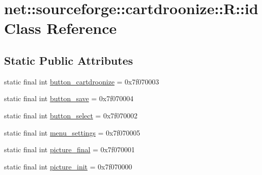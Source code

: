 \hypertarget{classnet_1_1sourceforge_1_1cartdroonize_1_1R_1_1id}{
\section{net::sourceforge::cartdroonize::R::id Class Reference}
\label{classnet_1_1sourceforge_1_1cartdroonize_1_1R_1_1id}
}
\subsection*{Static Public Attributes}
\begin{DoxyCompactItemize}
\item 
static final int \hyperlink{classnet_1_1sourceforge_1_1cartdroonize_1_1R_1_1id_a0edbb295d395022de863e4022c31b11d}{button\_\-cartdroonize} = 0x7f070003
\item 
static final int \hyperlink{classnet_1_1sourceforge_1_1cartdroonize_1_1R_1_1id_a70e902e6dfbc1f1283ba1f79e4ac3202}{button\_\-save} = 0x7f070004
\item 
static final int \hyperlink{classnet_1_1sourceforge_1_1cartdroonize_1_1R_1_1id_a4e70b30fe48b503ff1840462da704f1a}{button\_\-select} = 0x7f070002
\item 
static final int \hyperlink{classnet_1_1sourceforge_1_1cartdroonize_1_1R_1_1id_a0c5641c5ee704175eb1bbe4153e23398}{menu\_\-settings} = 0x7f070005
\item 
static final int \hyperlink{classnet_1_1sourceforge_1_1cartdroonize_1_1R_1_1id_a6406aea3f1bd1952d4f9e7fcf0b33450}{picture\_\-final} = 0x7f070001
\item 
static final int \hyperlink{classnet_1_1sourceforge_1_1cartdroonize_1_1R_1_1id_a5553ee92e4afb2ada8419ec105ccec7e}{picture\_\-init} = 0x7f070000
\end{DoxyCompactItemize}


